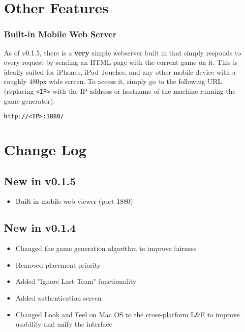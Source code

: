 \documentclass[10pt,a4paper]{report}
\begin{document}
\chapter{Other Features}
\subsection{Built-in Mobile Web Server}
As of v0.1.5, there is a \textbf{very} simple webserver built in that simply responds to every request by sending an HTML page with the current game on it.  This is ideally suited for iPhones, iPod Touches, and any other mobile device with a roughly 480px wide screen.  To access it, simply go to the following URL (replacing \verb+<IP>+ with the IP address or hostname of the machine running the game generator):

\begin{verbatim}
http://<IP>:1880/
\end{verbatim}

\chapter{Change Log}
\section{New in v0.1.5}
\begin{itemize}
\item Built-in mobile web viewer (port 1880)
\end{itemize}
\section{New in v0.1.4}
\begin{itemize}
\item Changed the game generation algorithm to improve fairness
\item Removed placement priority
\item Added "Ignore Last Team" functionality
\item Added authentication screen
\item Changed Look and Feel on Mac OS to the cross-platform L\&F to improve usability and unify the interface
\end{itemize}
\end{document}
